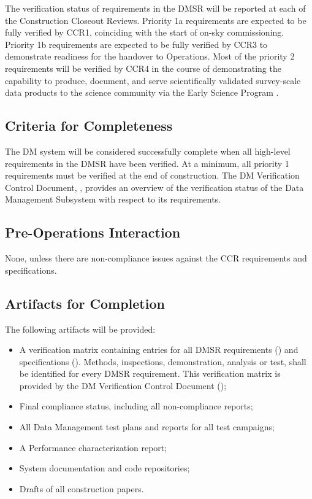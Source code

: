 The verification status of requirements in the DMSR will be reported at each of the Construction Closeout Reviews.
Priority 1a requirements are expected to be fully verified by CCR1, coinciding with the start of on-sky commissioning.
Priority 1b requirements are expected to be fully verified by CCR3 to demonstrate readiness for the handover to Operations.
Most of the priority 2 requirements will be verified by CCR4 in the course of demonstrating the capability to produce, document, and serve scientifically validated survey-scale data products to the science community via the Early Science Program .

\subsection{Criteria for Completeness} \label{sec:dm-completeness}
The DM system will be considered successfully complete when all high-level requirements in the DMSR have been verified.
At a minimum, all priority 1 requirements must be verified at the end of construction.
The DM Verification Control Document, ,  provides an overview of the verification status of the Data Management Subsystem with respect to its requirements.

\subsection{Pre-Operations Interaction}
None, unless there are non-compliance issues against the CCR requirements and specifications.

\subsection{Artifacts for Completion} \label{sec:dm-artifacts}
The following artifacts will be provided:
\begin{itemize}
	\item A verification matrix containing entries for all DMSR requirements () and specifications (). Methods, inspections, demonstration, analysis or test, shall be identified for every DMSR requirement. This verification matrix is provided by the DM Verification Control Document ();
	\item Final compliance status, including all non-compliance reports;
	\item All Data Management test plans and reports for all test campaigns;
	\item A Performance characterization report;
	\item System documentation and code repositories;
	\item Drafts of all construction papers.
\end{itemize}

